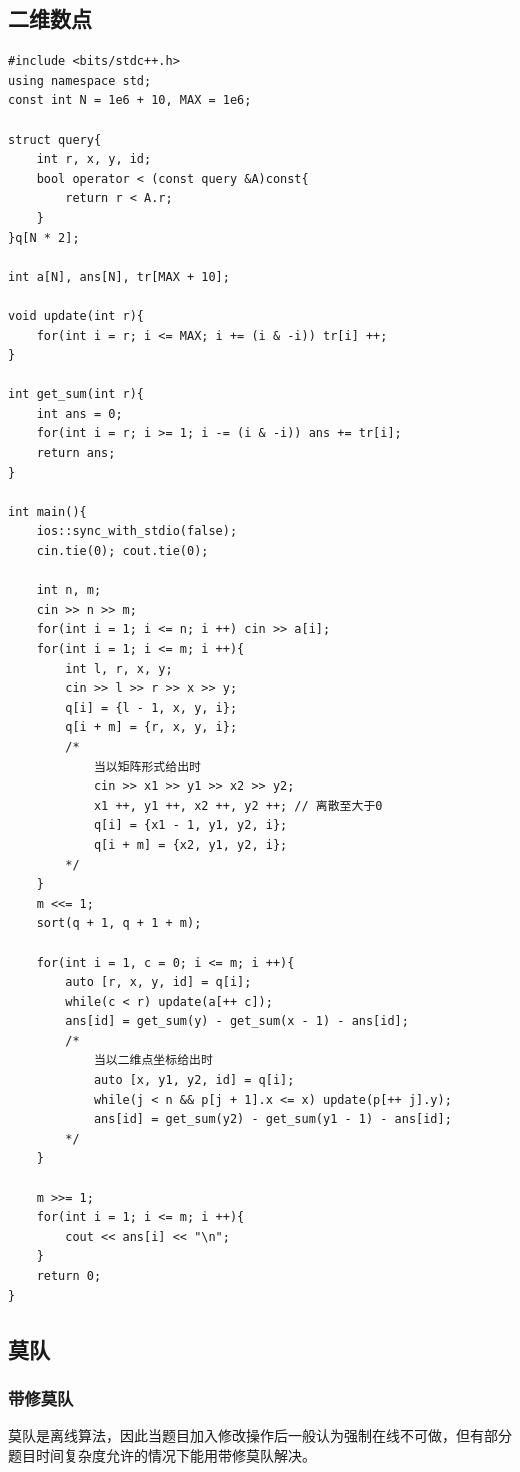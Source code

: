 \documentclass[12pt, a4paper, oneside]{ctexart}
\begin{document}
\subsection{二维数点} 
\begin{lstlisting}
#include <bits/stdc++.h>
using namespace std;
const int N = 1e6 + 10, MAX = 1e6;

struct query{
    int r, x, y, id;
    bool operator < (const query &A)const{
        return r < A.r;
    }
}q[N * 2];

int a[N], ans[N], tr[MAX + 10];

void update(int r){
    for(int i = r; i <= MAX; i += (i & -i)) tr[i] ++;
}

int get_sum(int r){
    int ans = 0;
    for(int i = r; i >= 1; i -= (i & -i)) ans += tr[i];
    return ans;
}

int main(){
    ios::sync_with_stdio(false);
    cin.tie(0); cout.tie(0);

    int n, m;
    cin >> n >> m;
    for(int i = 1; i <= n; i ++) cin >> a[i];
    for(int i = 1; i <= m; i ++){
        int l, r, x, y;
        cin >> l >> r >> x >> y;
        q[i] = {l - 1, x, y, i};
        q[i + m] = {r, x, y, i};
        /*
            当以矩阵形式给出时
            cin >> x1 >> y1 >> x2 >> y2;
            x1 ++, y1 ++, x2 ++, y2 ++; // 离散至大于0
            q[i] = {x1 - 1, y1, y2, i};
            q[i + m] = {x2, y1, y2, i};
        */
    }
    m <<= 1;
    sort(q + 1, q + 1 + m);

    for(int i = 1, c = 0; i <= m; i ++){
        auto [r, x, y, id] = q[i];
        while(c < r) update(a[++ c]);
        ans[id] = get_sum(y) - get_sum(x - 1) - ans[id];
        /*
            当以二维点坐标给出时
            auto [x, y1, y2, id] = q[i];
            while(j < n && p[j + 1].x <= x) update(p[++ j].y);
            ans[id] = get_sum(y2) - get_sum(y1 - 1) - ans[id];
        */
    }

    m >>= 1;
    for(int i = 1; i <= m; i ++){
        cout << ans[i] << "\n";
    }
    return 0;
}
\end{lstlisting}


\newpage 
\subsection{莫队}
\subsubsection{带修莫队} 
莫队是离线算法，因此当题目加入修改操作后一般认为强制在线不可做，但有部分题目时间复杂度允许的情况下能用带修莫队解决。\par
\end{document}
